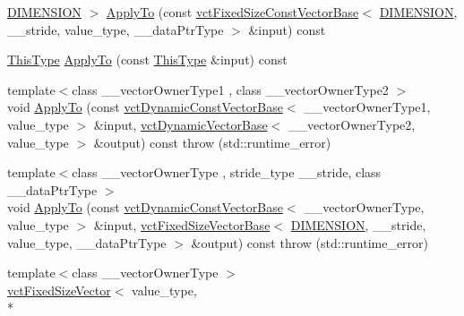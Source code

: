 \begin{DoxyCompactItemize}
\hyperlink{classvct_matrix_rotation3_const_base_a6bc9712dde55ee3fca0d7880feb6a903afdf02f4ad230d81f0ca2539c7feb61f3}{D\-I\-M\-E\-N\-S\-I\-O\-N} $>$ \hyperlink{classvct_matrix_rotation3_const_base_a2e6655de4bc25d980cabef0f4ef945a5}{Apply\-To} (const \hyperlink{classvct_fixed_size_const_vector_base}{vct\-Fixed\-Size\-Const\-Vector\-Base}$<$ \hyperlink{classvct_matrix_rotation3_const_base_a6bc9712dde55ee3fca0d7880feb6a903afdf02f4ad230d81f0ca2539c7feb61f3}{D\-I\-M\-E\-N\-S\-I\-O\-N}, \-\_\-\-\_\-stride, value\-\_\-type, \-\_\-\-\_\-data\-Ptr\-Type $>$ \&input) const 
\item 
\hyperlink{classvct_matrix_rotation3_const_base_ad26bf016ce37ea0532e1ce0aa7bba8a0}{This\-Type} \hyperlink{classvct_matrix_rotation3_const_base_a9a85987ac0bfca124f712bfab3be3ea5}{Apply\-To} (const \hyperlink{classvct_matrix_rotation3_const_base_ad26bf016ce37ea0532e1ce0aa7bba8a0}{This\-Type} \&input) const 
\item 
{\footnotesize template$<$class \-\_\-\-\_\-vector\-Owner\-Type1 , class \-\_\-\-\_\-vector\-Owner\-Type2 $>$ }\\void \hyperlink{classvct_matrix_rotation3_const_base_a517c1c190581dfe39a9565fdcf5a0d44}{Apply\-To} (const \hyperlink{classvct_dynamic_const_vector_base}{vct\-Dynamic\-Const\-Vector\-Base}$<$ \-\_\-\-\_\-vector\-Owner\-Type1, value\-\_\-type $>$ \&input, \hyperlink{classvct_dynamic_vector_base}{vct\-Dynamic\-Vector\-Base}$<$ \-\_\-\-\_\-vector\-Owner\-Type2, value\-\_\-type $>$ \&output) const   throw (std\-::runtime\-\_\-error)
\item 
{\footnotesize template$<$class \-\_\-\-\_\-vector\-Owner\-Type , stride\-\_\-type \-\_\-\-\_\-stride, class \-\_\-\-\_\-data\-Ptr\-Type $>$ }\\void \hyperlink{classvct_matrix_rotation3_const_base_a422584ee6e316eb5d2dc607728130d24}{Apply\-To} (const \hyperlink{classvct_dynamic_const_vector_base}{vct\-Dynamic\-Const\-Vector\-Base}$<$ \-\_\-\-\_\-vector\-Owner\-Type, value\-\_\-type $>$ \&input, \hyperlink{classvct_fixed_size_vector_base}{vct\-Fixed\-Size\-Vector\-Base}$<$ \hyperlink{classvct_matrix_rotation3_const_base_a6bc9712dde55ee3fca0d7880feb6a903afdf02f4ad230d81f0ca2539c7feb61f3}{D\-I\-M\-E\-N\-S\-I\-O\-N}, \-\_\-\-\_\-stride, value\-\_\-type, \-\_\-\-\_\-data\-Ptr\-Type $>$ \&output) const   throw (std\-::runtime\-\_\-error)
\item 
{\footnotesize template$<$class \-\_\-\-\_\-vector\-Owner\-Type $>$ }\\\hyperlink{classvct_fixed_size_vector}{vct\-Fixed\-Size\-Vector}$<$ value\-\_\-type, \\*

\end{DoxyCompactItemize}
